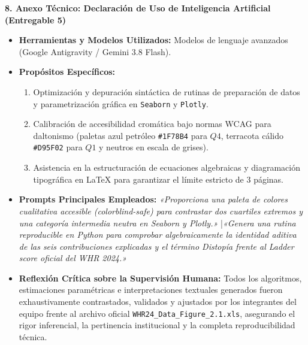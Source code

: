 \documentclass[9pt,a4paper]{article}
\newcommand{\customsection}[1]{%
  \vspace{0.2em}%
  {\small\bfseries\color{whrmagenta}#1}%
  \vspace{0.05em}\par%
}
\begin{document}
\customsection{8. Anexo Técnico: Declaración de Uso de Inteligencia Artificial (Entregable 5)}
\begin{itemize}[leftmargin=1.1em, itemsep=0.1em]
    \item \textbf{Herramientas y Modelos Utilizados:} Modelos de lenguaje avanzados (Google Antigravity / Gemini 3.8 Flash).
    \item \textbf{Propósitos Específicos:}
    \begin{enumerate}[label=(\alph*), nosep]
        \item Optimización y depuración sintáctica de rutinas de preparación de datos y parametrización gráfica en \texttt{Seaborn} y \texttt{Plotly}.
        \item Calibración de accesibilidad cromática bajo normas WCAG para daltonismo (paletas azul petróleo \texttt{\#1F78B4} para $Q4$, terracota cálido \texttt{\#D95F02} para $Q1$ y neutros en escala de grises).
        \item Asistencia en la estructuración de ecuaciones algebraicas y diagramación tipográfica en \LaTeX{} para garantizar el límite estricto de 3 páginas.
    \end{enumerate}
    \item \textbf{Prompts Principales Empleados:}
    \textit{«Proporciona una paleta de colores cualitativa accesible (colorblind-safe) para contrastar dos cuartiles extremos y una categoría intermedia neutra en Seaborn y Plotly.»} \quad|\quad \textit{«Genera una rutina reproducible en Python para comprobar algebraicamente la identidad aditiva de las seis contribuciones explicadas y el término Distopía frente al Ladder score oficial del WHR 2024.»}
    \item \textbf{Reflexión Crítica sobre la Supervisión Humana:} Todos los algoritmos, estimaciones paramétricas e interpretaciones textuales generados fueron exhaustivamente contrastados, validados y ajustados por los integrantes del equipo frente al archivo oficial \texttt{WHR24\_Data\_Figure\_2.1.xls}, asegurando el rigor inferencial, la pertinencia institucional y la completa reproducibilidad técnica.
\end{itemize}
\end{document}
